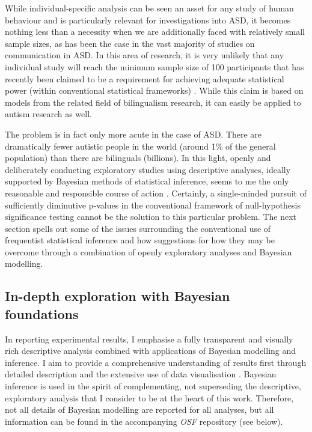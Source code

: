 While individual-specific analysis can be seen an asset for any study of human behaviour and is particularly relevant for investigations into ASD, it becomes nothing less than a necessity when we are additionally faced with relatively small sample sizes, as has been the case in the vast majority of studies on communication in ASD. In this area of research, it is very unlikely that any individual study will reach the minimum sample size of 100 participants that has recently been claimed to be a requirement for achieving adequate statistical power (within conventional statistical frameworks) \citep{brysbaertPowerConsiderationsBilingualism2020}. While this claim is based on models from the related field of bilingualism research, it can easily be applied to autism research as well.

The problem is in fact only more acute in the case of ASD. There are dramatically fewer autistic people in the world (around 1\% of the general population) than there are bilinguals (billions). In this light, openly and deliberately conducting exploratory studies using descriptive analyses, ideally supported by Bayesian methods of statistical inference, seems to me the only reasonable and responsible course of action \citep{grieveObservationExperimentationReplication2021, tukeyWeNeedBoth1980, vasishthStatisticalSignificanceFilter2018, yarkoniGeneralizabilityCrisis2022}. Certainly, a single-minded pursuit of sufficiently diminutive p-values in the conventional framework of null-hypothesis significance testing cannot be the solution to this particular problem. The next section spells out some of the issues surrounding the conventional use of frequentist statistical inference and how suggestions for how they may be overcome through a combination of openly exploratory analyses and Bayesian modelling.

\subsection{In-depth exploration with Bayesian foundations}\label{analysis_Bayesian}


In reporting experimental results, I emphasise a fully transparent and visually rich descriptive analysis combined with applications of Bayesian modelling and inference. I aim to provide a comprehensive understanding of results first through detailed description and the extensive use of data visualisation \citep{anscombeGraphsStatisticalAnalysis1973, matejkaSameStatsDifferent2017}. Bayesian inference is used in the spirit of complementing, not superseding the descriptive, exploratory analysis that I consider to be at the heart of this work. Therefore, not all details of Bayesian modelling are reported for all analyses, but all information can be found in the accompanying \textit{OSF} repository (see below).

